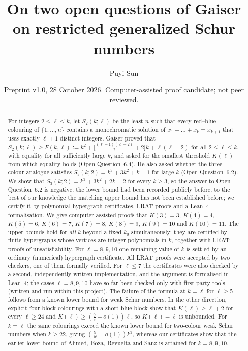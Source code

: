 \documentclass[11pt]{amsart}
\title[Two open questions on restricted generalized Schur numbers]{On two open questions of Gaiser on restricted generalized Schur numbers}
\author{Puyi Sun}
\date{Preprint v1.0, 28 October 2026. Computer-assisted proof candidate; not peer reviewed.}
\theoremstyle{definition}
\newcommand{\F}{F}
\newcommand{\Stwo}{S_2}
\begin{document}
\begin{abstract}
For integers $2\le \ell\le k$, let $\Stwo(k;\ell)$ be the least $n$ such that every red--blue colouring of $\{1,\dots,n\}$ contains a monochromatic solution of $x_1+\dots+x_k=x_{k+1}$ that uses exactly $\ell+1$ distinct integers. Gaiser proved that $\Stwo(k;\ell)\ge \F(k,\ell):=k^2+\bigl[\tfrac{(\ell+1)(\ell-2)}{2}+2\bigr]k+\ell(\ell-2)$ for all $2\le\ell\le k$, with equality for all sufficiently large $k$, and asked for the smallest threshold $K(\ell)$ from which equality holds (Open Question~6.4). He also asked whether the three-colour analogue satisfies $S_3(k;2)=k^3+3k^2+k-1$ for large $k$ (Open Question~6.2). We show that $S_3(k;2)=k^3+3k^2+2k-2$ for every $k\ge3$, so the answer to Open Question~6.2 is negative; the lower bound had been recorded publicly before, to the best of our knowledge the matching upper bound has not been established before; we certify it by polynomial hypergraph certificates, LRAT proofs and a Lean~4 formalisation. We give computer-assisted proofs that $K(3)=3$, $K(4)=4$, $K(5)=6$, $K(6)=7$, $K(7)=8$, $K(8)=9$, $K(9)=10$ and $K(10)=11$. The upper bounds hold for \emph{all} $k$ beyond a fixed $k_0$ simultaneously; they are certified by finite hypergraphs whose vertices are integer polynomials in $k$, together with LRAT proofs of unsatisfiability. For $\ell=8,9,10$ one remaining value of $k$ is settled by an ordinary (numerical) hypergraph certificate. All LRAT proofs were accepted by two checkers, one of them formally verified. For $\ell\le7$ the certificates were also checked by a second, independently written implementation, and the argument is formalised in Lean~4; the cases $\ell=8,9,10$ have so far been checked only with first-party tools (written and run within this project). The failure of the formula at $k=\ell$ for $\ell\ge5$ follows from a known lower bound for weak Schur numbers. In the other direction, explicit four-block colourings with a short blue block show that $K(\ell)\ge\ell+2$ for every $\ell\ge24$ and $K(\ell)\ge(\tfrac98-o(1))\ell$, so $K(\ell)-\ell$ is unbounded. For $k=\ell$ the same colourings exceed the known lower bound for two-colour weak Schur numbers when $k\ge22$, giving $(\tfrac9{16}-o(1))k^3$, whereas our certificates show that the earlier lower bound of Ahmed, Boza, Revuelta and Sanz is attained for $k=8,9,10$.
\end{abstract}

\maketitle
\end{document}
